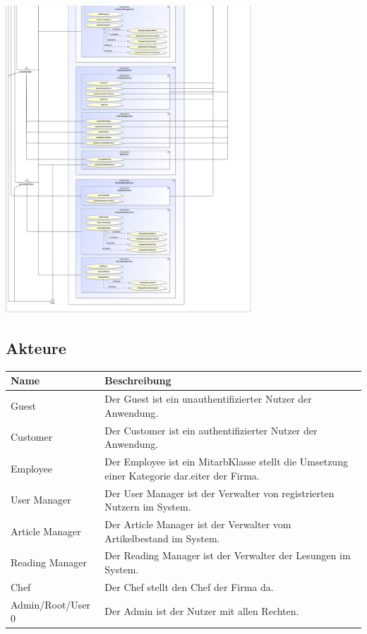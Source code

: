 \documentclass[a4paper]{article}
\begin{document}
\includegraphics[width=350px]{use-case-diagramm-part3.jpg}

\subsection{Akteure}

\begin{tabular}{|p{100px}|p{250px}|}
	\hline
	\rowcolor[HTML]{C0C0C0} 
	Name & Beschreibung	\\ \hline
	Guest & Der Guest ist ein unauthentifizierter Nutzer der Anwendung.\\ \hline
	Customer & Der Customer ist ein authentifizierter Nutzer der Anwendung.\\ \hline
	Employee & Der Employee ist ein MitarbKlasse stellt die Umsetzung einer Kategorie dar.eiter der Firma.\\ \hline
	User Manager & Der User Manager ist der Verwalter von registrierten Nutzern im System.\\ \hline
	Article Manager & Der Article Manager ist der Verwalter vom Artikelbestand im System.\\ \hline
	Reading Manager & Der Reading Manager ist der Verwalter der Lesungen im System.\\ \hline
	Chef & Der Chef stellt den Chef der Firma da.\\ \hline
	Admin/Root/User 0 & Der Admin ist der Nutzer mit allen Rechten.\\ \hline
\end{tabular}
\end{document}
